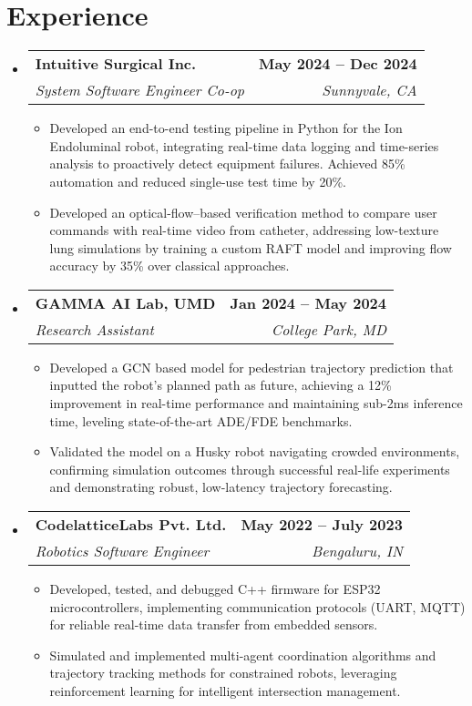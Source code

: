 \documentclass[letterpaper,10pt]{article}
\makeatletter
\newcommand{\resumeItem}[1]{
  \item\small{
    {#1 \vspace{-2pt}}
  }
}
\newcommand{\resumeSubheading}[4]{
  \vspace{-2pt}\item
    \begin{tabular*}{1.0\textwidth}[t]{l@{\extracolsep{\fill}}r}
      \textbf{#1} & \textbf{\small #2} \\
      \textit{\small#3} & \textit{\small #4} \\
    \end{tabular*}\vspace{-7pt}
}
\newcommand{\resumeSubHeadingListStart}{\begin{itemize}[leftmargin=0.0in, label={}]}
\newcommand{\resumeSubHeadingListEnd}{\end{itemize}}
\newcommand{\resumeItemListStart}{\begin{itemize}}
\newcommand{\resumeItemListEnd}{\end{itemize}\vspace{-5pt}}
\makeatother
\begin{document}
\section{Experience}
  \resumeSubHeadingListStart

  \resumeSubheading
      {Intuitive Surgical Inc.}{May 2024 -- Dec 2024}
      {System Software Engineer Co-op}{Sunnyvale, CA}
      \resumeItemListStart
      \justifying
        \resumeItem{Developed an end-to-end testing pipeline in Python for the Ion Endoluminal robot, integrating real-time data logging and time-series analysis to proactively detect equipment failures. Achieved 85\% automation and reduced single-use test time by 20\%.}
        \resumeItem{Developed an optical-flow–based verification method to compare user commands with real-time video from catheter, addressing low-texture lung simulations by training a custom RAFT model and improving flow accuracy by 35\% over classical approaches.}
      \resumeItemListEnd

      \resumeSubheading
      {GAMMA AI Lab, UMD}{Jan 2024 -- May 2024}
      {Research Assistant}{College Park, MD}
      \resumeItemListStart
        \justifying
        \resumeItem{Developed a GCN based model for pedestrian trajectory prediction that inputted the robot’s planned path as future, achieving a 12\% improvement in real-time performance and maintaining sub-2ms inference time, leveling state-of-the-art ADE/FDE benchmarks.}
        \resumeItem{Validated the model on a Husky robot navigating crowded environments, confirming simulation outcomes through successful real-life experiments and demonstrating robust, low-latency trajectory forecasting.}
      \resumeItemListEnd

    \resumeSubheading
      {CodelatticeLabs Pvt. Ltd.}{May 2022 -- July 2023}
      {Robotics Software Engineer}{Bengaluru, IN}
      \resumeItemListStart
      \justifying
        \resumeItem{Developed, tested, and debugged C++ firmware for ESP32 microcontrollers, implementing communication protocols (UART, MQTT) for reliable real-time data transfer from embedded sensors.} %
        \resumeItem{Simulated and implemented multi-agent coordination algorithms and trajectory tracking methods for constrained robots, leveraging reinforcement learning for intelligent intersection management.}
      \resumeItemListEnd
    
  \resumeSubHeadingListEnd
\end{document}
